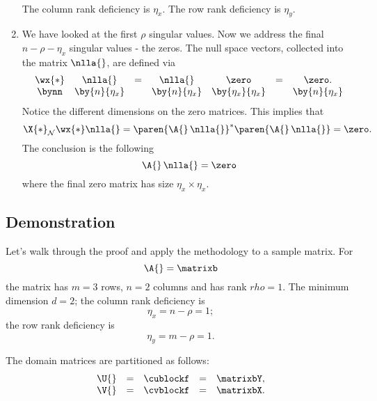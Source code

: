 \begin{enumerate}
\begin{equation}
\begin{split}
  \end{split}
\end{equation}
\subitem The column rank deficiency is $\eta_{x}$.
\subitem The row rank deficiency is $\eta_{y}$.
\item {} We have looked at the first $\rho$ singular values. Now we address the final $n-\rho-\eta_{x}$ singular values - the zeros. The null space vectors, collected into the matrix $\nlla{}$, are defined via
\begin{equation}
\begin{array}{ccccccc}
  \wx{*} & \nlla{} &=& \nlla{}&\zero &=& \zero.\\
  \bynn  & \by{n}{\eta_{x}}    && \by{n}{\eta_{x}} & \by{\eta_{x}}{\eta_{x}} && \by{n}{\eta_{x}}
\end{array}
\end{equation}
\subitem Notice the different dimensions on the zero matrices.
This implies that
\begin{equation}
  \X{*}_{\mathcal{N}}\wx{*}\nlla{} = \paren{\A{}\,\nlla{}}^{*}\paren{\A{}\,\nlla{}} = \zero.
\end{equation}
The conclusion is the following
\begin{equation}
  \A{}\,\nlla{} = \zero
\end{equation}
where the final zero matrix has size $\eta_{x}\times \eta_{x}$.
\end{enumerate}

\subsection{Demonstration}
Let's walk through the proof and apply the methodology to a sample matrix. For 
\begin{equation}
  \A{} = \matrixb
\end{equation}
the matrix has $m=3$ rows, $n=2$ columns and has rank $rho=1$. The minimum dimension $d=2$; the column rank deficiency is
\begin{equation}
  \eta_{x} = n - \rho = 1;
\end{equation}
the row rank deficiency is
\begin{equation}
  \eta_{y} = m - \rho = 1.
\end{equation}

The domain matrices are partitioned as follows:
\begin{equation}
  \begin{array}{lcccl}
    \U{} &=& \cublockf &=& \matrixbY, \\
    \V{} &=& \cvblockf &=& \matrixbX.
  \end{array}
\end{equation}

